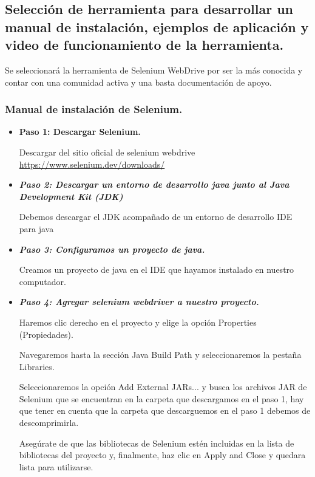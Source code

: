 \documentclass[letterpaper]{article}
\begin{document}
\bigskip

\subsection{Selección de herramienta para desarrollar un manual de instalación, ejemplos de aplicación y video de
funcionamiento de la herramienta.}
Se seleccionará la herramienta de Selenium WebDrive por ser la más conocida y contar con una comunidad activa y una
basta documentación de apoyo.

\subsubsection{Manual de instalación de Selenium. }
\begin{itemize}[series=listWWNumx,]
\item \textbf{Paso 1: Descargar Selenium.}

Descargar del sitio oficial de selenium webdrive \url{https://www.selenium.dev/downloads/}

\item \textbf{\textit{Paso 2: Descargar un entorno de desarrollo java junto al Java Development Kit (JDK)}}

Debemos descargar el JDK acompañado de un entorno de desarrollo IDE para java

\item \textbf{\textit{Paso 3: Configuramos un proyecto de java.}}

Creamos un proyecto de java en el IDE que hayamos instalado en nuestro computador.

\item \textbf{\textit{Paso 4: Agregar selenium webdriver a nuestro proyecto.}}

Haremos clic derecho en el proyecto y elige la opción {\textquotedbl}Properties{\textquotedbl} (Propiedades).

Navegaremos hasta la sección {\textquotedbl}Java Build Path{\textquotedbl} y seleccionaremos la pestaña
{\textquotedbl}Libraries{\textquotedbl}.

Seleccionaremos la opción {\textquotedbl}Add External JARs...{\textquotedbl} y busca los archivos JAR de Selenium que se
encuentran en la carpeta que descargamos en el paso 1, hay que tener en cuenta que la carpeta que descarguemos en el
paso 1 debemos de descomprimirla.

Asegúrate de que las bibliotecas de Selenium estén incluidas en la lista de bibliotecas del proyecto y, finalmente, haz
clic en {\textquotedbl}Apply and Close{\textquotedbl} y quedara lista para utilizarse.


\end{itemize}
\end{document}
